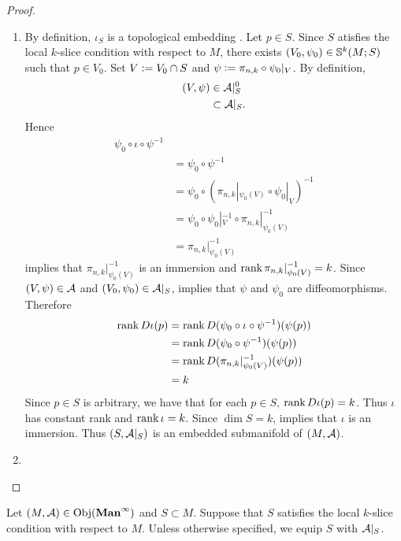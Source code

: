 \documentclass{book}
\begin{document}
	\begin{proof} \
		\begin{enumerate}
			\item By definition, $\iota_S$ is a topological embedding . Let $p \in S$. Since $S$ atisfies the local $k$-slice condition with respect to $M$, there exists $(V_0, \psi_0) \in \S^k(M; S)$ such that $p \in V_0$. Set $V \defeq V_0 \cap S$ and $\psi \defeq \pi_{n,k} \circ \psi_0|_V$. By definition,  
			\begin{align*}
				(V, \psi) 
				& \in \MA|_S^0 \\
				& \subset \MA|_S.
			\end{align*}
			Hence 
			\begin{align*}
				\psi_0 \circ \iota \circ \psi^{-1} \\
				& = \psi_0 \circ \psi^{-1} \\
				& = \psi_0 \circ (\pi_{n,k}|_{\psi_0(V)} \circ \psi_0|_V)^{-1} \\
				& = \psi_0 \circ \psi_0|_V^{-1} \circ \pi_{n,k}|_{\psi_0(V)}^{-1} \\
				& = \pi_{n,k}|_{\psi_0(V)}^{-1} 
			\end{align*}
			 implies that $\pi_{n,k}|_{\psi_0(V)}^{-1}$ is an immersion and $\rnk \pi_{n,k}|_{\psi_0(V)}^{-1} = k$. Since $(V, \psi) \in \MA$ and $(V_0, \psi_0) \in \MA|_S$,  implies that $\psi$ and $\psi_0$ are diffeomorphisms. Therefore
			\begin{align*}
				\rnk D \iota (p)
				& = \rnk D (\psi_0 \circ \iota \circ \psi^{-1})(\psi(p)) \\
				& = \rnk D (\psi_0 \circ \psi^{-1})(\psi(p)) \\
				& = \rnk D (\pi_{n,k}|_{\psi_0(V)}^{-1})(\psi(p)) \\
				& = k
			\end{align*}  
			Since $p \in S$ is arbitrary, we have that for each $p \in S$, $\rnk D \iota (p) = k$. Thus $\iota$ has constant rank and $\rnk \iota = k$. Since $\dim S = k$,  implies that $\iota$ is an immersion. Thus $(S, \MA|_S)$ is an embedded submanifold of $(M, \MA)$.
			\item \tcr{FINISH!!!} 
		\end{enumerate}
	\end{proof}
	
	\begin{note}
		Let $(M, \MA) \in \Obj(\Maninf)$ and $S \subset M$. Suppose that $S$ satisfies the local $k$-slice condition with respect to $M$. Unless otherwise specified, we equip $S$ with $\MA|_S$.
	\end{note}
	
\end{document}
